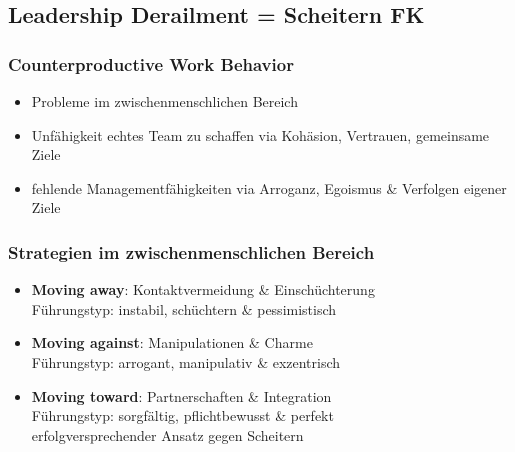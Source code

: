 \documentclass{cheatsheet}
\begin{document}
    \subsection{Leadership Derailment = Scheitern FK}
    \begin{normbox}{\subsubsection{Counterproductive Work Behavior}}
        \begin{itemize}
            \item Probleme im zwischenmenschlichen Bereich
            \item Unfähigkeit echtes Team zu schaffen via Kohäsion, Vertrauen, gemeinsame Ziele
            \item fehlende Managementfähigkeiten via Arroganz, Egoismus \& Verfolgen eigener Ziele
        \end{itemize}
    \end{normbox}
    \begin{normbox}{\subsubsection{Strategien im zwischenmenschlichen Bereich}}
        \begin{itemize}
            \item \textbf{Moving away}: Kontaktvermeidung \& Einschüchterung\\
            \ra Führungstyp: instabil, schüchtern \& pessimistisch
            \item \textbf{Moving against}: Manipulationen \& Charme\\
            \ra Führungstyp: arrogant, manipulativ \& exzentrisch
            \item \textbf{Moving toward}: Partnerschaften \& Integration\\
            \ra Führungstyp: sorgfältig, pflichtbewusst \& perfekt\\
            \ra erfolgversprechender Ansatz gegen Scheitern
        \end{itemize}
    \end{normbox}
\end{document}
